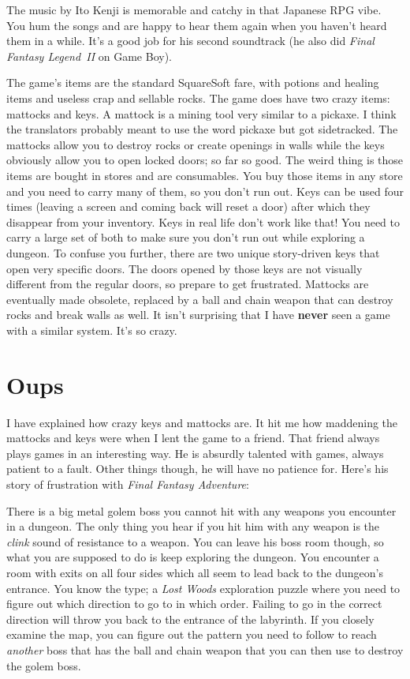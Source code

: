 \documentclass{book}
\begin{document}
The music by Ito Kenji is memorable and catchy in that Japanese RPG vibe. You hum the songs and are happy to hear them again when you haven’t heard them in a while. It’s a good job for his second soundtrack (he also did \emph{Final Fantasy Legend II} on Game Boy).

The game’s items are the standard SquareSoft fare, with potions and healing items and useless crap and sellable rocks. The game does have two crazy items: mattocks and keys. A mattock is a mining tool very similar to a pickaxe. I think the translators probably meant to use the word pickaxe but got sidetracked. The mattocks allow you to destroy rocks or create openings in walls while the keys obviously allow you to open locked doors; so far so good. The weird thing is those items are bought in stores and are consumables. You buy those items in any store and you need to carry many of them, so you don’t run out. Keys can be used four times (leaving a screen and coming back will reset a door) after which they disappear from your inventory. Keys in real life don’t work like that! You need to carry a large set of both to make sure you don’t run out while exploring a dungeon. To confuse you further, there are two unique story-driven keys that open very specific doors. The doors opened by those keys are not visually different from the regular doors, so prepare to get frustrated. Mattocks are eventually made obsolete, replaced by a ball and chain weapon that can destroy rocks and break walls as well. It isn’t surprising that I have \textbf{never} seen a game with a similar system. It’s so crazy.

\FloatBarrier\needspace{5pt}\section*{Oups}\nopagebreak[4]

I have explained how crazy keys and mattocks are. It hit me how maddening the mattocks and keys were when I lent the game to a friend. That friend always plays games in an interesting way. He is absurdly talented with games, always patient to a fault. Other things though, he will have no patience for. Here’s his story of frustration with \emph{Final Fantasy Adventure}:

There is a big metal golem boss you cannot hit with any weapons you encounter in a dungeon. The only thing you hear if you hit him with any weapon is the \emph{clink} sound of resistance to a weapon. You can leave his boss room though, so what you are supposed to do is keep exploring the dungeon. You encounter a room with exits on all four sides which all seem to lead back to the dungeon’s entrance. You know the type; a \emph{Lost Woods} exploration puzzle where you need to figure out which direction to go to in which order. Failing to go in the correct direction will throw you back to the entrance of the labyrinth. If you closely examine the map, you can figure out the pattern you need to follow to reach \emph{another} boss that has the ball and chain weapon that you can then use to destroy the golem boss.
\end{document}
